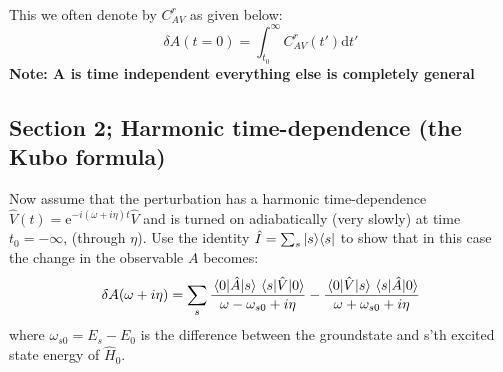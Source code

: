 \begin{solution}
\begin{equation}
\begin{split}
        \label{eq:Sol:21}
\end{split}
\end{equation}
This we often denote by $C_{AV}^{r}$ as given below:
\begin{equation}
    \delta A(t=0) = \int_{t_0}^{\infty}C_{AV}^{r}(t')\mathrm{d}t'
\end{equation}
\textbf{Note: A is time independent everything else is completely general}
\end{solution}

\subsection{Section 2; Harmonic time-dependence (the Kubo formula)}

\begin{exercise}
Now assume that the perturbation has a harmonic time-dependence $\hat{V} (t) = \mathrm{e}^{-i(\omega +i\eta)t}\hat{V}$ and is turned on adiabatically (very slowly) at time $t_0 = -\infty$, (through $\eta$). Use the identity $\hat{I} = \sum_{s} |s\rangle\langle s |$ to show that in this case the change in the observable $A$ becomes:
\begin{equation}
    \delta A(\omega + i\eta) = \sum_{s} \dfrac{\mel{0}{\hat{A}}{s}\mel{s}{\hat{V}}{0}}{\omega - \omega_{s0} + i\eta} - \dfrac{\mel{0}{\hat{V}}{s}\mel{s}{\hat{A}}{0}}{\omega + \omega_{s0} + i\eta} 
\end{equation}
where $\omega_{s0} = E_s - E_0$ is the difference between the groundstate and s'th excited state energy of $\hat{H}_0$.
\end{exercise}
